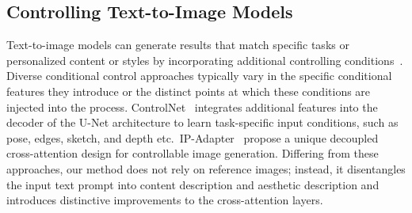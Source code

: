 \subsection{Controlling Text-to-Image Models} 
Text-to-image models can generate results that match specific tasks or personalized content or styles by incorporating additional controlling conditions~\cite{mou2023t2i,wei2023elite}. Diverse conditional control approaches typically vary in the specific conditional features they introduce or the distinct points at which these conditions are injected into the process. ControlNet~\cite{zhang2023adding} integrates additional features into the decoder of the U-Net architecture to learn task-specific input conditions, such as pose, edges, sketch, and depth etc.\ IP-Adapter~\cite{ye2023ip} propose a unique decoupled cross-attention design for controllable image generation. Differing from these approaches, our method does not rely on reference images; instead, it disentangles the input text prompt into content description and aesthetic description and introduces distinctive improvements to the cross-attention layers.

